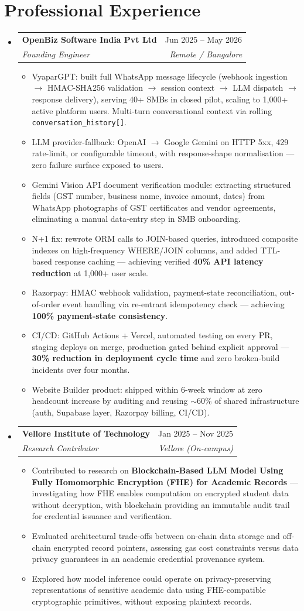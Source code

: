 \documentclass[a4paper,10pt]{article}
\makeatletter
\newcommand{\resumeItem}[1]{
  \item\small{{#1 \vspace{-2pt}}}
}
\newcommand{\resumeSubheading}[4]{
  \vspace{-2pt}\item
    \begin{tabular*}{\textwidth}{l@{\extracolsep{\fill}}r}
      \textbf{#1} & #2 \\
      \textit{\small#3} & \textit{\small #4} \\
    \end{tabular*}\vspace{-7pt}
}
\newcommand{\resumeSubHeadingListStart}{\begin{itemize}[leftmargin=0.15in, label={}]}
\newcommand{\resumeSubHeadingListEnd}{\end{itemize}}
\newcommand{\resumeItemListStart}{\begin{itemize}}
\newcommand{\resumeItemListEnd}{\end{itemize}\vspace{-5pt}}
\makeatother
\begin{document}
\section{Professional Experience}
  \resumeSubHeadingListStart
    \resumeSubheading
      {OpenBiz Software India Pvt Ltd}{Jun 2025 -- May 2026}
      {Founding Engineer}{Remote / Bangalore}
      \resumeItemListStart
        \resumeItem{VyaparGPT: built full WhatsApp message lifecycle (webhook ingestion $\rightarrow$ HMAC-SHA256 validation $\rightarrow$ session context $\rightarrow$ LLM dispatch $\rightarrow$ response delivery), serving 40+ SMBs in closed pilot, scaling to 1,000+ active platform users. Multi-turn conversational context via rolling \texttt{conversation\_history[]}.}
        \resumeItem{LLM provider-fallback: OpenAI $\rightarrow$ Google Gemini on HTTP 5xx, 429 rate-limit, or configurable timeout, with response-shape normalisation --- zero failure surface exposed to users.}
        \resumeItem{Gemini Vision API document verification module: extracting structured fields (GST number, business name, invoice amount, dates) from WhatsApp photographs of GST certificates and vendor agreements, eliminating a manual data-entry step in SMB onboarding.}
        \resumeItem{N+1 fix: rewrote ORM calls to JOIN-based queries, introduced composite indexes on high-frequency WHERE/JOIN columns, and added TTL-based response caching --- achieving verified \textbf{40\% API latency reduction} at 1,000+ user scale.}
        \resumeItem{Razorpay: HMAC webhook validation, payment-state reconciliation, out-of-order event handling via re-entrant idempotency check --- achieving \textbf{100\% payment-state consistency}.}
        \resumeItem{CI/CD: GitHub Actions + Vercel, automated testing on every PR, staging deploys on merge, production gated behind explicit approval --- \textbf{30\% reduction in deployment cycle time} and zero broken-build incidents over four months.}
        \resumeItem{Website Builder product: shipped within 6-week window at zero headcount increase by auditing and reusing $\sim$60\% of shared infrastructure (auth, Supabase layer, Razorpay billing, CI/CD).}
      \resumeItemListEnd

    \resumeSubheading
      {Vellore Institute of Technology}{Jan 2025 -- Nov 2025}
      {Research Contributor}{Vellore (On-campus)}
      \resumeItemListStart
        \resumeItem{Contributed to research on \textbf{Blockchain-Based LLM Model Using Fully Homomorphic Encryption (FHE) for Academic Records} --- investigating how FHE enables computation on encrypted student data without decryption, with blockchain providing an immutable audit trail for credential issuance and verification.}
        \resumeItem{Evaluated architectural trade-offs between on-chain data storage and off-chain encrypted record pointers, assessing gas cost constraints versus data privacy guarantees in an academic credential provenance system.}
        \resumeItem{Explored how model inference could operate on privacy-preserving representations of sensitive academic data using FHE-compatible cryptographic primitives, without exposing plaintext records.}
      \resumeItemListEnd
  \resumeSubHeadingListEnd
\end{document}
